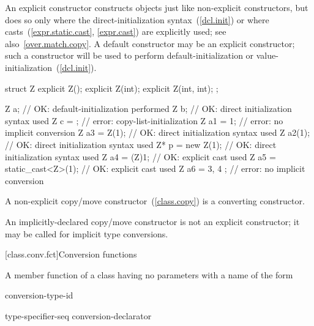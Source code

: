 \pnum
\begin{note}
An explicit constructor constructs objects just like non-explicit
constructors, but does so only where the direct-initialization syntax~(\ref{dcl.init})
or where casts~(\ref{expr.static.cast}, \ref{expr.cast}) are explicitly
used; see also~\ref{over.match.copy}.
A default constructor may be an explicit constructor; such a constructor
will be used to perform default-initialization
or value-initialization~(\ref{dcl.init}).
\begin{example}
\begin{codeblock}
struct Z {
  explicit Z();
  explicit Z(int);
  explicit Z(int, int);
};

Z a;                            // OK: default-initialization performed
Z b{};                          // OK: direct initialization syntax used
Z c = {};                       // error: copy-list-initialization
Z a1 = 1;                       // error: no implicit conversion
Z a3 = Z(1);                    // OK: direct initialization syntax used
Z a2(1);                        // OK: direct initialization syntax used
Z* p = new Z(1);                // OK: direct initialization syntax used
Z a4 = (Z)1;                    // OK: explicit cast used
Z a5 = static_cast<Z>(1);       // OK: explicit cast used
Z a6 = { 3, 4 };                // error: no implicit conversion
\end{codeblock}
\end{example}
\end{note}

\pnum
A
non-explicit
copy/move constructor~(\ref{class.copy}) is a converting constructor.
\begin{note}
An implicitly-declared copy/move constructor is not an explicit constructor;
it may be called for implicit type conversions.
\end{note}

[class.conv.fct]{Conversion functions}%
%
%
%

\pnum
A member function of a class  having no parameters with a name of the form

\begin{bnf}
\br
     conversion-type-id
\end{bnf}

\begin{bnf}
\br
    type-specifier-seq conversion-declarator\opt
\end{bnf}

